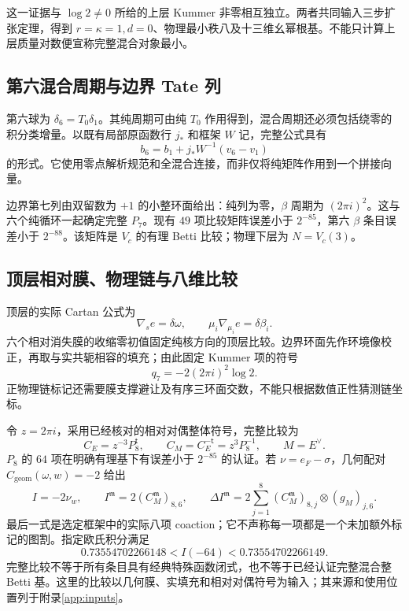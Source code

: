 \documentclass[11pt,a4paper,oneside]{ctexart}
\theoremstyle{cnplain}
\theoremstyle{definition}
\theoremstyle{remark}
\numberwithin{equation}{section}
\begin{document}
这一证据与 $\log2\ne0$ 所给的上层 Kummer 非零相互独立。两者共同输入三步扩张定理，得到 $r=\kappa=1,d=0$、物理最小秩八及十三维幺幂根基。不能只计算上层质量对数便宣称完整混合对象最小。


\subsection{第六混合周期与边界 Tate 列}
第六球为 $\delta_6=T_0\delta_1$。其纯周期可由纯 $T_0$ 作用得到，混合周期还必须包括绕零的积分类增量。以既有局部原函数行 $j_*$ 和框架 $W$ 记，完整公式具有
\begin{equation}
 b_6=b_1+j_*W^{-1}(v_6-v_1)
\end{equation}
的形式。它使用零点解析规范和全混合连接，而非仅将纯矩阵作用到一个拼接向量。

边界第七列由双留数为 $+1$ 的小整环面给出：纯列为零，$\beta$ 周期为 $(2\pi i)^2$。这与六个纯循环一起确定完整 $P_7$。现有 $49$ 项比较矩阵误差小于 $2^{-85}$，第六 $\beta$ 条目误差小于 $2^{-88}$。该矩阵是 $V_c$ 的有理 Betti 比较；物理下层为 $N=V_c(3)$。


\subsection{顶层相对膜、物理链与八维比较}
顶层的实际 Cartan 公式为
\begin{equation}
 \nabla_s e=\delta\omega,\qquad
 \mu_i\nabla_{\mu_i}e=\delta\beta_i.
\end{equation}
六个相对消失膜的收缩零初值固定纯核方向的顶层比较。边界环面先作环境像校正，再取与实共轭相容的填充；由此固定 Kummer 项的符号
\begin{equation}
 q_7=-2(2\pi i)^2\log2.
\end{equation}
正物理链标记还需要膜支撑避让及有序三环面交数，不能只根据数值正性猜测链坐标。

令 $z=2\pi i$，采用已经核对的相对对偶整体符号，完整比较为
\begin{equation}
 C_E=z^{-3}P_8^{\mathsf t},\qquad C_M=C_E^{-\mathsf t}=z^3P_8^{-1},
 \qquad M=E^\vee.
\end{equation}
$P_8$ 的 $64$ 项在明确有理基下有误差小于 $2^{-85}$ 的认证。若 $\nu=e_F-\sigma$，几何配对 $C_{\mathrm{geom}}(\omega,w)=-2$ 给出
\begin{equation}
 I=-2\nu_w,\qquad I^{\mathfrak m}=2(C_M^{\mathfrak m})_{8,6},\qquad
 \Delta I^{\mathfrak m}=2\sum_{j=1}^8(C_M^{\mathfrak m})_{8,j}\otimes(g_M)_{j,6}.
\end{equation}
最后一式是选定框架中的实际八项 coaction；它不声称每一项都是一个未加额外标记的图割。指定欧氏积分满足
\begin{equation}
 0.73554702266148<I(-64)<0.73554702266149.
\end{equation}
完整比较不等于所有条目具有经典特殊函数闭式，也不等于已经认证完整混合整 Betti 基。这里的比较以几何膜、实填充和相对对偶符号为输入；其来源和使用位置列于附录\ref{app:inputs}。
\end{document}
